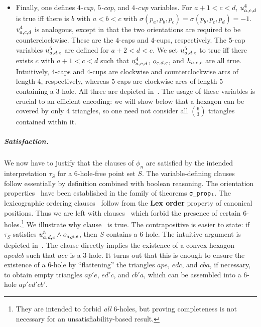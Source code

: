 \begin{itemize}
  \item
    Finally, one defines \emph{$4$-cap}, \emph{$5$-cap}, and \emph{$4$-cup} variables.
    For $a+1 < c < d$, $\uvar_{a,c,d}$ is true
    iff there is $b$ with $a < b < c$ with $\sigma(p_a,p_b,p_c) = \sigma(p_b,p_c,p_d) = -1$.
    $\vvar_{a,c,d}$ is analogous, except in that the two orientations are required to be counterclockwise.
    These are the $4$-caps and $4$-cups, respectively.
    The $5$-cap variables $\ufvar_{a,d,e}$
    are defined for $a+2 < d < e$.
    We set $\ufvar_{a,d,e}$ to true
    iff there exists $c$ with $a+1<c<d$
    such that $\uvar_{a,c,d}$, $\orvar_{c,d,e}$, and $\hvar_{a,c,e}$ are all true.
    Intuitively, $4$-caps and $4$-cups are clockwise and counterclockwise arcs of length $4$,
    respectively,
    whereas $5$-caps are clockwise arcs of length $5$ containing a $3$-hole.
    All three are depicted in~. The usage of these variables is crucial to an efficient encoding:
    we will show below that a hexagon can be covered by only $4$ triangles,
    so one need not consider all ${6\choose 3}$ triangles contained within it.
\end{itemize}



\subparagraph*{Satisfaction.}
We now have to justify that the clauses of $\phi_n$
are satisfied by the intended interpretation $\tau_S$
for a $6$-hole-free point set $S$.
The variable-defining clauses~
follow essentially by definition combined with boolean reasoning.
The orientation properties~
have been established in the family of theorems \lstinline|σ_propᵢ|.
The lexicographic ordering clauses~
follow from the \textbf{Lex order} property of canonical positions.
Thus we are left with clauses~
which forbid the presence of certain $6$-holes.\footnote{
They are intended to forbid \emph{all} $6$-holes,
but proving completeness is not necessary for an unsatisfiability-based result.}
We illustrate why clause~ is true.
The contrapositive is easier to state:
if $\tau_S$ satisfies $\ufvar_{a,d,e}\wedge\orvar_{a,p,e}$,
then $S$ contains a $6$-hole.
The intuitive argument is depicted in~.
The clause directly implies the existence of a convex hexagon $apedcb$
such that $ace$ is a $3$-hole.
It turns out that this is enough to ensure
the existence of a $6$-hole by ``flattening'' the triangles $ape$, $edc$, and $cba$,
if necessary,
to obtain empty triangles $ap'e$, $ed'c$, and $cb'a$,
which can be assembled into a $6$-hole $ap'ed'cb'$.

